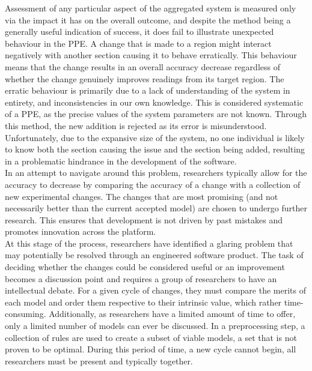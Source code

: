 \documentclass{ecmm427_assignment}
\begin{document}
\quad Assessment of any particular aspect of the aggregated system is measured only via the impact it has on the overall outcome, and despite the method being a generally useful indication of success, it does fail to illustrate unexpected behaviour in the PPE. A change that is made to a region might interact negatively with another section causing it to behave erratically. This behaviour means that the change results in an overall accuracy decrease regardless of whether the change genuinely improves readings from its target region. The erratic behaviour is primarily due to a lack of understanding of the system in entirety, and inconsistencies in our own knowledge. This is considered systematic of a PPE, as the precise values of the system parameters are not known. Through this method, the new addition is rejected as its error is misunderstood. Unfortunately, due to the expansive size of the system, no one individual is likely to know both the section causing the issue and the section being added, resulting in a problematic hindrance in the development of the software.\\

\quad In an attempt to navigate around this problem, researchers typically allow for the accuracy to decrease by comparing the accuracy of a change with a collection of new experimental changes. The changes that are most promising (and not necessarily better than the current accepted model) are chosen to undergo further research. This ensures that development is not driven by past mistakes and promotes innovation across the platform.\\

\quad At this stage of the process, researchers have identified a glaring problem that may potentially be resolved through an engineered software product. The task of deciding whether the changes could be considered useful or an improvement becomes a discussion point and requires a group of researchers to have an intellectual debate. For a given cycle of changes, they must compare the merits of each model and order them respective to their intrinsic value, which rather time-consuming. Additionally, as researchers have a limited amount of time to offer, only a limited number of models can ever be discussed. In a preprocessing step, a collection of rules are used to create a subset of viable models, a set that is not proven to be optimal. During this period of time, a new cycle cannot begin, all researchers must be present and typically together.\\
\end{document}
